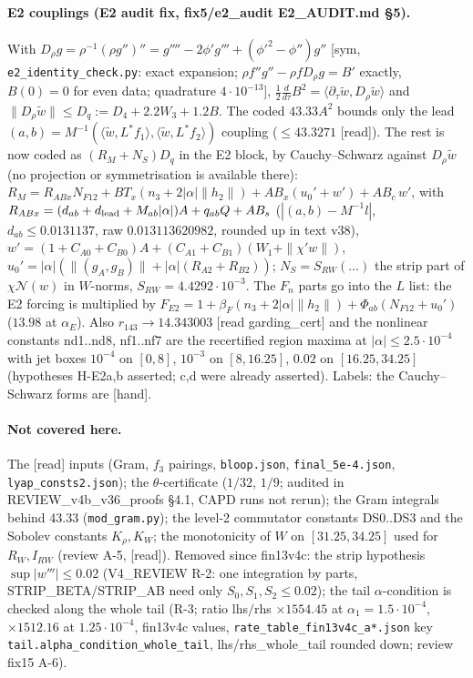 \documentclass[10pt]{article}
\newcommand{\wt}{\tilde w}
\newcommand{\ip}[2]{\langle #1,#2\rangle}
\begin{document}
\paragraph{E2 couplings (E2 audit fix, fix5/e2\_audit E2\_AUDIT.md \S5).} With $D_\rho g=\rho^{-1}(\rho g'')''=g''''-2\phi'g'''+(\phi'^2-\phi'')g''$
[sym, \texttt{e2\_identity\_check.py}: exact expansion; $\rho f''g''-\rho fD_\rho g=B'$ exactly, $B(0)=0$ for even data; quadrature $4\cdot10^{-13}$],
$\tfrac12\frac{d}{d\tau}B^2=\ip{\partial_\tau\wt}{D_\rho\wt}$ and $\|D_\rho\wt\|\le D_q:=D_4+2.2W_3+1.2B$. The coded $43.33A^2$ bounds only the lead
$(a,b)=M^{-1}(\ip{\wt}{L^*f_1},\ip{\wt}{L^*f_2})$ coupling ($\le43.3271$ [read]). The rest is now coded as $(R_M+N_S)D_q$ in the E2 block, by Cauchy--Schwarz
against $D_\rho\wt$ (no projection or symmetrisation is available there):
$R_M=R_{ABx}N_{F12}+BT_x(n_3+2|\alpha|\|h_2\|)+AB_x(u_{0}'+w')+AB_c\,w'$, with $R_{ABx}=(d_{ab}+d_{\rm lead}+M_{ab}|\alpha|)A+q_{ab}Q+AB_s$
($|(a,b)-M^{-1}l|$, $d_{ab}\le0.0131137$, raw $0.013113620982$, rounded up in text v38), $w'=(1+C_{A0}+C_{B0})A+(C_{A1}+C_{B1})(W_1+\|\chi'w\|)$, $u_0'=|\alpha|(\|(g_A,g_B)\|+|\alpha|(R_{A2}+R_{B2}))$;
$N_S=S_{RW}(\dots)$ the strip part of $\chi\mathcal N(w)$ in $W$-norms, $S_{RW}=4.4292\cdot10^{-3}$. The $F_n$ parts go into the $L$ list: the E2 forcing
is multiplied by $F_{E2}=1+\beta_F(n_3+2|\alpha|\|h_2\|)+\Phi_{ab}(N_{F12}+u_0')$ ($13.98$ at $\alpha_E$). Also $r_{143}\to14.343003$ [read garding\_cert]
and the nonlinear constants nd1..nd8, nf1..nf7 are the recertified region maxima at $|\alpha|\le2.5\cdot10^{-4}$ with jet boxes $10^{-4}$ on $[0,8]$,
$10^{-3}$ on $[8,16.25]$, $0.02$ on $[16.25,34.25]$ (hypotheses H-E2a,b asserted; c,d were already asserted). Labels: the Cauchy--Schwarz forms are [hand].

\paragraph{Not covered here.} The [read] inputs (Gram, $f_3$ pairings, \texttt{bloop.json}, \texttt{final\_5e-4.json}, \texttt{lyap\_consts2.json}); the $\theta$-certificate
($1/32$, $1/9$; audited in REVIEW\_v4b\_v36\_proofs \S4.1, CAPD runs not rerun); the Gram integrals behind 43.33 (\texttt{mod\_gram.py});
the level-2 commutator constants DS0..DS3 and the Sobolev constants $K_\rho,K_W$; the monotonicity of $W$ on $[31.25,34.25]$ used for $R_W,I_{RW}$ (review A-5, [read]).
Removed since fin13v4c: the strip hypothesis $\sup|w'''|\le0.02$ (V4\_REVIEW R-2: one integration by parts, STRIP\_BETA/STRIP\_AB need only $S_0,S_1,S_2\le0.02$);
the tail $\alpha$-condition is checked along the whole tail (R-3; ratio lhs$/$rhs $\times1554.45$ at $\alpha_1=1.5\cdot10^{-4}$, $\times1512.16$ at $1.25\cdot10^{-4}$, fin13v4c values, \texttt{rate\_table\_fin13v4c\_a*.json} key \texttt{tail.alpha\_condition\_whole\_tail}, lhs/rhs\_whole\_tail rounded down; review fix15 A-6).
\end{document}
